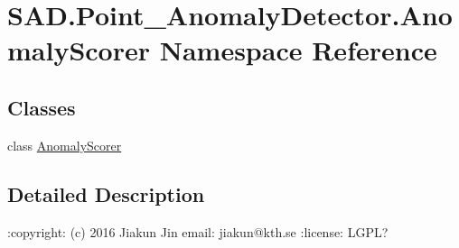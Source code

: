 \hypertarget{namespaceSAD_1_1Point__AnomalyDetector_1_1AnomalyScorer}{}\section{S\+A\+D.\+Point\+\_\+\+Anomaly\+Detector.\+Anomaly\+Scorer Namespace Reference}
\label{namespaceSAD_1_1Point__AnomalyDetector_1_1AnomalyScorer}
\subsection*{Classes}
\begin{DoxyCompactItemize}
\item 
class \hyperlink{classSAD_1_1Point__AnomalyDetector_1_1AnomalyScorer_1_1AnomalyScorer}{Anomaly\+Scorer}
\end{DoxyCompactItemize}


\subsection{Detailed Description}
\begin{DoxyVerb}:copyright: (c) 2016 Jiakun Jin
email: jiakun@kth.se
:license: LGPL?
\end{DoxyVerb}
 